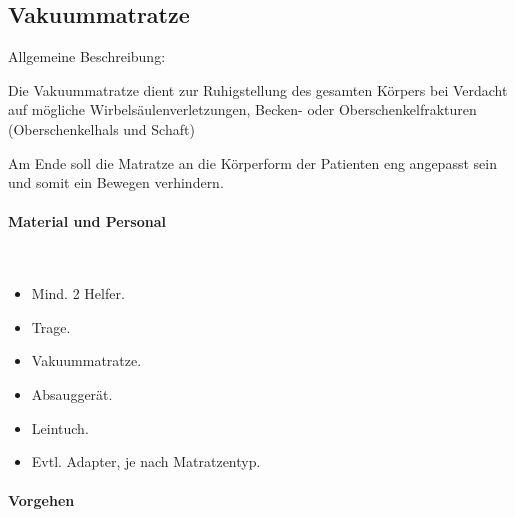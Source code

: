 
\subsection{Vakuummatratze}
\label{topic:vakuummatratze-handhabung}

Allgemeine
Beschreibung: 

Die Vakuummatratze dient zur Ruhigstellung des gesamten Körpers bei Verdacht
auf mögliche Wirbelsäulenverletzungen, Becken- oder Oberschenkelfrakturen
(Oberschenkelhals und Schaft)

Am Ende soll die Matratze an die Körperform der Patienten eng
angepasst sein und somit ein Bewegen verhindern.

\paragraph*{Material und Personal}~

\begin{itemize}
    \item Mind. 2 Helfer.
    \item Trage.
    \item Vakuummatratze.
    \item Absauggerät.
    \item Leintuch.
    \item Evtl. Adapter, je nach Matratzentyp.
\end{itemize}


\paragraph*{Vorgehen}~

